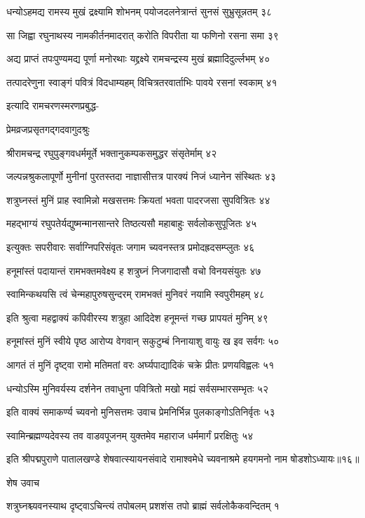धन्योऽहमद्य रामस्य मुखं द्रक्ष्यामि शोभनम्
पयोजदलनेत्रान्तं सुनसं सुभ्रुसून्नतम् ३८

सा जिह्वा रघुनाथस्य नामकीर्तनमादरात्
करोति विपरीता या फणिनो रसना समा ३९

अद्य प्राप्तं तपःपुण्यमद्य पूर्णा मनोरथाः
यद्द्रक्ष्ये रामचन्द्रस्य मुखं ब्रह्मादिदुर्ल्लभम् ४०

तत्पादरेणुना स्वाङ्गं पवित्रं विदधाम्यहम्
विचित्रतरवार्ताभिः पावये रसनां स्वकाम् ४१

इत्यादि रामचरणस्मरणप्रबुद्ध-

प्रेमव्रजप्रसृतगद्गदवागुदश्रुः

श्रीरामचन्द्र रघुपुङ्गवधर्ममूर्ते
भक्तानुकम्पकसमुद्धर संसृतेर्माम् ४२

जल्पन्नश्रुकलापूर्णो मुनीनां पुरतस्तदा
नाज्ञासीत्तत्र पारक्यं निजं ध्यानेन संस्थितः ४३

शत्रुघ्नस्तं मुनिं प्राह स्वामिन्नो मखसत्तमः
क्रियतां भवता पादरजसा सुपवित्रितः ४४

महद्भाग्यं रघुपतेर्यद्युष्मन्मानसान्तरे
तिष्ठत्यसौ महाबाहुः सर्वलोकसुपूजितः ४५

इत्युक्तः सपरीवारः सर्वाग्निपरिसंवृतः
जगाम च्यवनस्तत्र प्रमोदह्रदसम्प्लुतः ४६

हनूमांस्तं पदायान्तं रामभक्तमवेक्ष्य ह
शत्रुघ्नं निजगादासौ वचो विनयसंयुतः ४७

स्वामिन्कथयसि त्वं चेन्महापुरुषसुन्दरम्
रामभक्तं मुनिवरं नयामि स्वपुरीमहम् ४८

इति श्रुत्वा महद्वाक्यं कपिवीरस्य शत्रुहा
आदिदेश हनूमन्तं गच्छ प्रापयतं मुनिम् ४९

हनूमांस्तं मुनिं स्वीये पृष्ठ आरोप्य वेगवान्
सकुटुम्बं निनायाशु वायुः ख इव सर्वगः ५०

आगतं तं मुनिं दृष्ट्वा रामो मतिमतां वरः
अर्घ्यपाद्यादिकं चक्रे प्रीतः प्रणयविह्वलः ५१

धन्योऽस्मि मुनिवर्यस्य दर्शनेन तवाधुना
पवित्रितो मखो मह्यं सर्वसम्भारसम्भृतः ५२

इति वाक्यं समाकर्ण्य च्यवनो मुनिसत्तमः
उवाच प्रेमनिर्भिन्न पुलकाङ्गोऽतिनिर्वृतः ५३

स्वामिन्ब्रह्मण्यदेवस्य तव वाडवपूजनम्
युक्तमेव महाराज धर्ममार्गं प्ररक्षितुः ५४

इति श्रीपद्मपुराणे पातालखण्डे शेषवात्स्यायनसंवादे रामाश्वमेधे च्यवनाश्रमे हयगमनो नाम षोडशोऽध्यायः॥१६॥


शेष उवाच

शत्रुघ्नश्च्यवनस्याथ दृष्ट्वाऽचिन्त्यं तपोबलम्
प्रशशंस तपो ब्राह्मं सर्वलोकैकवन्दितम् १

